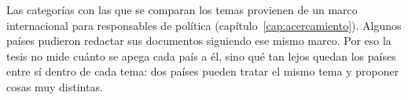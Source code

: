 Las categorías con las que se comparan los temas provienen de un marco internacional para
responsables de política (capítulo~\ref{cap:acercamiento}). Algunos países pudieron
redactar sus documentos siguiendo ese mismo marco. Por eso la tesis no mide cuánto se apega
cada país a él, sino qué tan lejos quedan los países entre sí dentro de cada tema: dos
países pueden tratar el mismo tema y proponer cosas muy distintas.
